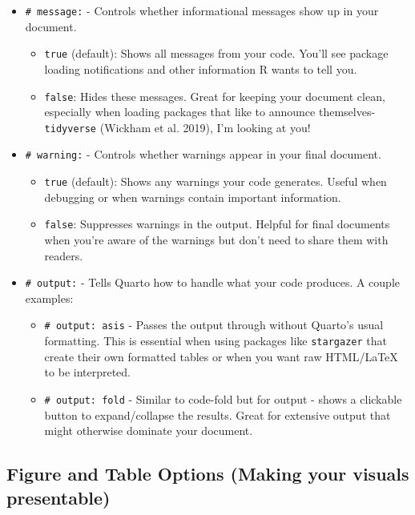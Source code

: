 \documentclass[
  letterpaper,
]{book}
\providecommand{\tightlist}{%
  \setlength{\itemsep}{0pt}\setlength{\parskip}{0pt}}\usepackage{longtable,booktabs,array}
\begin{document}
\begin{itemize}
\item
  \texttt{\#\textbar{}\ message:} - Controls whether informational
  messages show up in your document.

  \begin{itemize}
  \tightlist
  \item
    \texttt{true} (default): Shows all messages from your code. You'll
    see package loading notifications and other information R wants to
    tell you.
  \item
    \texttt{false}: Hides these messages. Great for keeping your
    document clean, especially when loading packages that like to
    announce themselves-\texttt{tidyverse} (Wickham et al. 2019), I'm
    looking at you!
  \end{itemize}
\item
  \texttt{\#\textbar{}\ warning:} - Controls whether warnings appear in
  your final document.

  \begin{itemize}
  \tightlist
  \item
    \texttt{true} (default): Shows any warnings your code generates.
    Useful when debugging or when warnings contain important
    information.
  \item
    \texttt{false}: Suppresses warnings in the output. Helpful for final
    documents when you're aware of the warnings but don't need to share
    them with readers.
  \end{itemize}
\item
  \texttt{\#\textbar{}\ output:} - Tells Quarto how to handle what your
  code produces. A couple examples:

  \begin{itemize}
  \tightlist
  \item
    \texttt{\#\textbar{}\ output:\ asis} - Passes the output through
    without Quarto's usual formatting. This is essential when using
    packages like \texttt{stargazer} that create their own formatted
    tables or when you want raw HTML/LaTeX to be interpreted.
  \item
    \texttt{\#\textbar{}\ output:\ fold} - Similar to code-fold but for
    output - shows a clickable button to expand/collapse the results.
    Great for extensive output that might otherwise dominate your
    document.
  \end{itemize}
\end{itemize}

\subsection{Figure and Table Options (Making your visuals
presentable)}\label{figure-and-table-options-making-your-visuals-presentable}
\end{document}

